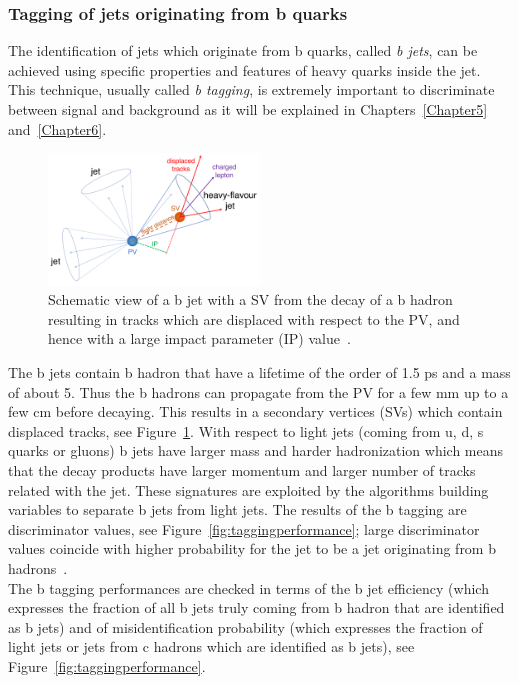 \subsubsection{Tagging of jets originating from b
  quarks}\label{sec:tagging}
The identification of jets which originate from b quarks, called
\emph{b jets}, can be achieved using
specific properties and features of heavy
quarks inside the jet. This technique, usually called \emph{b tagging}, is
extremely important to discriminate between signal and background as
it will be explained in Chapters~\ref{Chapter5}
and~\ref{Chapter6}.

\begin{figure}[h]
\centering
    \includegraphics[clip,trim=0.3cm 0.5cm 0.3cm 0.3cm, width=0.50\textwidth]{Figures/c2/tagging}
  \caption{Schematic view of a b jet with a SV from the decay of a b hadron resulting in tracks which are displaced with respect to the PV, and hence with a large impact parameter (IP) value~\cite{Sirunyan_2018_tagging}.}
\label{fig:btagging}
\end{figure}

The b jets contain b hadron that have a lifetime of the order of 1.5
ps and a mass of about
5\GeV. Thus the b hadrons can propagate from
the PV for a few mm up to a few cm before decaying. This results in
a secondary vertices (SVs) which contain displaced tracks, see
Figure~\ref{fig:btagging}. With respect to light jets (coming from
u, d, s quarks or gluons) b jets have larger mass and harder hadronization which
means that the decay products have larger momentum and larger number
of tracks related with the jet. These signatures are exploited by the
algorithms building variables to separate b jets from
light jets. The results of the b tagging are discriminator values, see Figure~\ref{fig:taggingperformance}; large discriminator values coincide with higher probability for
the jet to be a jet originating from b hadrons~\cite{CMS-DP-2017-013,
  csv}.\\
The b tagging performances are checked in terms of the b jet
efficiency (which expresses the fraction of all b jets truly coming from b hadron
that are identified as b jets) and of misidentification probability
(which expresses the fraction of light jets or jets from c hadrons
which are identified as b jets), see
Figure~\ref{fig:taggingperformance}. 

